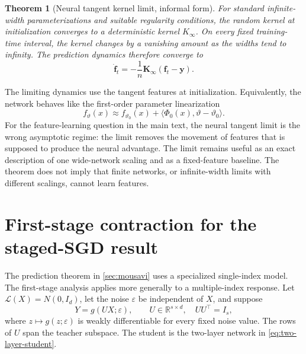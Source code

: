 \documentclass[11pt,twoside]{article}
\newcommand{\Law}{\mathcal L}
\newcommand{\R}{\mathbb R}
\newtheorem{theorem}{Theorem}[section]
\theoremstyle{definition}
\theoremstyle{remark}
\begin{document}
\begin{theorem}[Neural tangent kernel limit, informal form]
\label{thm:ntk-limit}
For standard infinite-width parameterizations and suitable regularity
conditions, the random kernel at initialization converges to a deterministic
kernel $K_\infty$. On every fixed training-time interval, the kernel changes
by a vanishing amount as the widths tend to infinity. The prediction dynamics
therefore converge to
\begin{equation}
 \dot{\mathbf f}_t
 =-\frac1n\mathbf K_\infty(\mathbf f_t-\mathbf y).
 \label{eq:limiting-ntk-dynamics}
\end{equation}
\end{theorem}

The limiting dynamics use the tangent features at initialization. Equivalently,
the network behaves like the first-order parameter linearization
\begin{equation}
 f_\vartheta(x)
 \approx f_{\vartheta_0}(x)
 +\langle\Phi_0(x),\vartheta-\vartheta_0\rangle.
 \label{eq:network-linearization}
\end{equation}
For the feature-learning question in the main text, the neural tangent limit
is the wrong asymptotic regime: the limit removes the movement of features
that is supposed to produce the neural advantage. The limit remains useful as
an exact description of one wide-network scaling and as a fixed-feature
baseline. The theorem does not imply that finite networks, or infinite-width
limits with different scalings, cannot learn features.

\section{First-stage contraction for the staged-SGD result}
\label{app:sgd-contraction}

The prediction theorem in \cref{sec:mousavi} uses a specialized single-index
model. The first-stage analysis applies more generally to a multiple-index
response. Let \(\Law(X)=N(0,I_d)\), let the noise \(\varepsilon\) be independent
of \(X\), and suppose
\begin{equation}
 Y=g(UX;\varepsilon),
 \qquad U\in\R^{s\times d},\quad UU^\top=I_s,
 \label{eq:mousavi-model}
\end{equation}
where \(z\mapsto g(z;\varepsilon)\) is weakly differentiable for every fixed
noise value. The rows of \(U\) span the teacher subspace. The student is the
two-layer network in \cref{eq:two-layer-student}.
\end{document}
